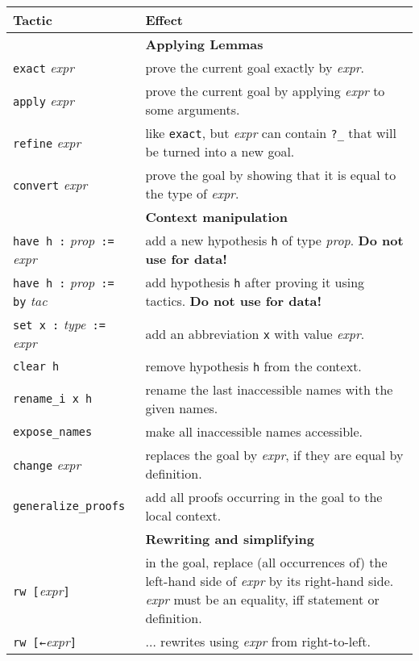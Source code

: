 \documentclass[a4paper]{article}
\newcommand{\lean}[1]{{\tt #1}}
\newcommand{\expr}[1][]{\textit{expr#1}\xspace}
\newcommand{\proposition}{\textit{prop}\xspace}
\newcommand{\tactic}[1][]{\textit{tac#1}\xspace} %
\newcommand{\type}{\textit{type}\xspace}
\newcommand{\warning}{\faWarning\xspace}
\begin{document}
\begin{center}
\setlength\tabcolsep{5mm}
\def\arraystretch{1.3}
\begin{longtable}{@{}lp{113mm}@{}}
  \toprule
  Tactic & Effect \\
  \midrule
  &\textbf{Applying Lemmas}\\
  \lean{exact} \expr & prove the current goal exactly by \expr. \\
  \lean{apply} \expr & prove the current goal by applying \expr to some arguments. \\
  \lean{refine} \expr & like \lean{exact}, but \expr can contain \lean{?\_} that will be turned into a new goal. \\
  \lean{convert} \expr & prove the goal by showing that it is equal to the type of \expr. \\
  \hline
  &\textbf{Context manipulation}\\
  \lean{have h :} \proposition\ \lean{:=} \expr & add a new hypothesis \lean{h} of type \proposition. \warning \textbf{Do not use for data!} \\
  \lean{have h :} \proposition\ \lean{:= by} \tactic & add hypothesis \lean{h} after proving it using tactics. \warning \textbf{Do not use for data!} \\
  \lean{set x :} \type\ \lean{:=} \expr & add an abbreviation \lean{x} with value \expr. \\
  \lean{clear h} & remove hypothesis \lean{h} from the context.\\
  \lean{rename\_i x h} & rename the last inaccessible names with the given names.\\
  \lean{expose\_names} & make all inaccessible names accessible.\\
  \lean{change} \expr & replaces the goal by \expr, if they are equal by definition.\\
  \lean{generalize\_proofs} & add all proofs occurring in the goal to the local context.\\
  \hline
  &\textbf{Rewriting and simplifying}\\
  \lean{rw [}\expr\lean{]} & in the goal, replace (all occurrences of) the left-hand side
  of \expr by its right-hand side. \expr must be an equality, iff statement or definition.\\
  \lean{rw [←}\expr\lean{]} & $\ldots$ rewrites using \expr from right-to-left. \\

\end{longtable}
\end{center}
\end{document}
